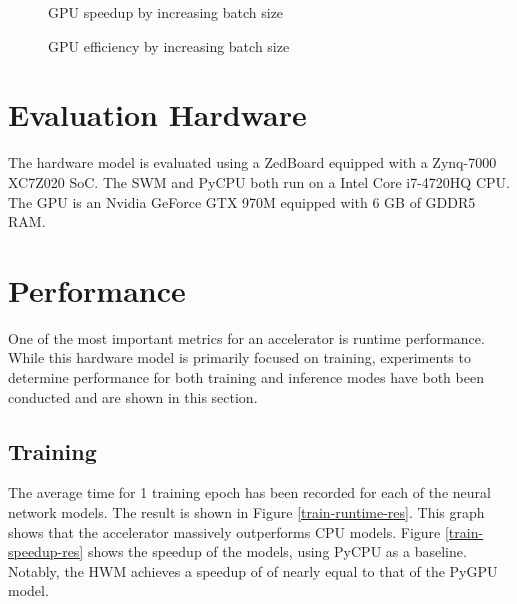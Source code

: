 \begin{figure}
	\centering
	\caption{GPU speedup by increasing batch size}
	\label{gpu-speedup}
\end{figure}

\begin{figure}
	\centering
	\caption{GPU efficiency by increasing batch size}
	\label{gpu-eff}
\end{figure}

\section{Evaluation Hardware}
The hardware model is evaluated using a ZedBoard equipped with a Zynq-7000 XC7Z020 SoC. The SWM and PyCPU both run on a Intel Core i7-4720HQ CPU. The GPU is an Nvidia GeForce GTX 970M equipped with 6 GB of GDDR5 RAM.

\section{Performance}
One of the most important metrics for an accelerator is runtime performance. 
While this hardware model is primarily focused on training, experiments to determine performance for both training and inference modes have both been conducted and are shown in this section.

\subsection{Training}
The average time for 1 training epoch has been recorded for each of the neural network models. The result is shown in Figure \ref{train-runtime-res}. This graph shows that the accelerator massively outperforms CPU models. Figure \ref{train-speedup-res} shows the speedup of the models, using PyCPU as a baseline. Notably, the HWM achieves a speedup of of nearly equal to that of the PyGPU model.

